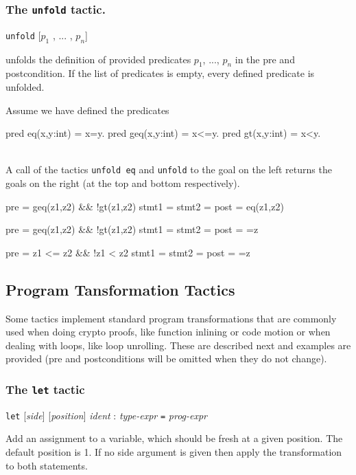 \subsubsection{The \texttt{unfold} tactic.}

\Syntax \verb+unfold+ [$p_1$ , ... , $p_n$]

\Description unfolds the definition of provided predicates $p_1$, ...,
$p_n$ in the pre and postcondition. If the list of predicates is
empty, every defined predicate is unfolded.

\Example Assume we have defined the predicates 

\begin{minicode}{1}
pred eq(x,y:int) = x=y.
pred geq(x,y:int) = x<=y.
pred gt(x,y:int) = x<y.
\end{minicode}
\\

\noindent
A call of the tactics \verb+unfold eq+ and \verb+unfold+ to the goal
on the left returns the goals on the right (at the top and bottom respectively).

\begin{minicode}{0.5}
pre   = geq(z{1},z{2}) && !gt(z{1},z{2})
stmt1 = 
stmt2 = 
post  = eq(z{1},z{2})
\end{minicode}
\begin{minicode}{0.5}
pre   = geq(z{1},z{2}) && !gt(z{1},z{2})
stmt1 = 
stmt2 = 
post  = ={z}

pre   = z{1} <= z{2} && !z{1} < z{2}
stmt1 = 
stmt2 = 
post  = ={z}
\end{minicode}

\subsection{Program Tansformation Tactics}
Some \easycrypt tactics implement standard program transformations
that are commonly used when doing crypto proofs, like function
inlining or code motion or when dealing with loops, like loop
unrolling. These are described next and examples are provided (pre and
postconditions will be omitted when they do not change). 

\subsubsection{The \texttt{let} tactic}\label{tac:let}\DONE
\Syntax 
\verb+let+ [\textit{side}] [\textit{position}] \textit{ident} : \textit{type-expr}
 \verb+=+ \textit{prog-expr}

\Description
Add an assignment to a variable, which should be fresh at a given position.
The default position is 1. If no side argument is given then  apply the
transformation to both statements.

